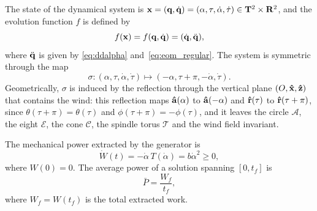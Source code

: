 The state of the dynamical system is \(\vb x = (\vb q, \dot{\vb q}) = (\alpha, \tau, \dot \alpha, \dot \tau) \in \mathbf{T}^2\times\mathbf{R}^2\), and the evolution function \(f\) is defined by
\begin{equation}
    f(\vb x) = f(\vb q, \dot{\vb q}) = (\dot{\vb q}, \ddot{\vb q}),
\end{equation}
where \(\ddot{\vb q}\) is given by \eqref{eq:ddalpha} and~\eqref{eq:eom_regular}.
The system is symmetric through the map
\begin{equation} \label{eq:symmetry}
    \sigma: (\alpha, \tau, \dot \alpha, \dot \tau) \mapsto (-\alpha, \tau + \pi, -\dot \alpha, \dot \tau).
\end{equation}
Geometrically, \(\sigma\) is induced by the reflection through the vertical plane \((O,\vu x,\vu z)\) that contains the wind: this reflection maps \(\vu a(\alpha)\) to \(\vu a(-\alpha)\) and \(\vu r(\tau)\) to \(\vu r(\tau+\pi)\), since \(\theta(\tau+\pi) = \theta(\tau)\) and \(\phi(\tau+\pi) = -\phi(\tau)\), and it leaves the circle \(\mathscr{A}\), the eight \(\mathscr{E}\), the cone \(\mathscr{C}\), the spindle torus \(\mathscr{T}\) and the wind field invariant.

The mechanical power extracted by the generator is
\begin{equation}
    \dot W(t)
    = -\dot\alpha\,T(\dot\alpha)
    = b\dot\alpha^2\geq0,
\end{equation}
where \(W(0)=0\). The average power of a solution spanning \([0, t_f]\) is
\begin{equation}
    \bar P=\frac{W_f}{t_f},
\end{equation}
where \(W_f=W(t_f)\) is the total extracted work.
